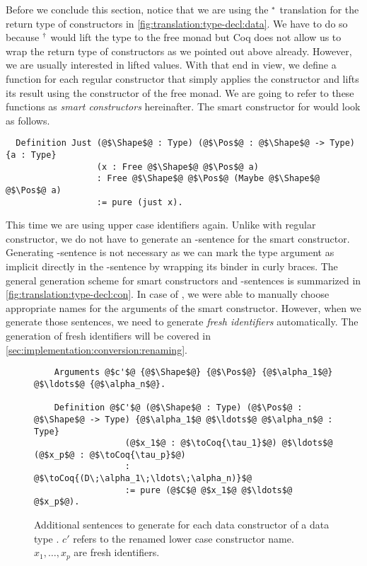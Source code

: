 Before we conclude this section, notice that we are using the ${}^{*}$ translation for the return type of constructors in \autoref{fig:translation:type-decl:data}.
We have to do so because ${}^{\dagger}$ would lift the type to the free monad but Coq does not allow us to wrap the return type of constructors as we pointed out above already.
However, we are usually interested in lifted values.
With that end in view, we define a function for each regular constructor that simply applies the constructor and lifts its result using the  constructor of the free monad.
We are going to refer to these functions as \textit{smart constructors} hereinafter.
The smart constructor for  would look as follows.
\begin{verbatim}
  Definition Just (@$\Shape$@ : Type) (@$\Pos$@ : @$\Shape$@ -> Type) {a : Type}
                  (x : Free @$\Shape$@ @$\Pos$@ a)
                  : Free @$\Shape$@ @$\Pos$@ (Maybe @$\Shape$@ @$\Pos$@ a)
                  := pure (just x).
\end{verbatim}
This time we are using upper case identifiers again.
Unlike with regular constructor, we do not have to generate an -sentence for the smart constructor.
Generating -sentence is not necessary as we can mark the type argument as implicit directly in the -sentence by wrapping its binder in curly braces.
The general generation scheme for smart constructors and -sentences is summarized in \autoref{fig:translation:type-decl:con}.
In case of , we were able to manually choose appropriate names for the arguments of the smart constructor.
However, when we generate those sentences, we need to generate \textit{fresh identifiers} automatically.
The generation of fresh identifiers will be covered in \autoref{sec:implementation:conversion:renaming}.

\begin{figure}[H]
  \begin{verbatim}
    Arguments @$c'$@ {@$\Shape$@} {@$\Pos$@} {@$\alpha_1$@} @$\ldots$@ {@$\alpha_n$@}.

    Definition @$C'$@ (@$\Shape$@ : Type) (@$\Pos$@ : @$\Shape$@ -> Type) {@$\alpha_1$@ @$\ldots$@ @$\alpha_n$@ : Type}
                  (@$x_1$@ : @$\toCoq{\tau_1}$@) @$\ldots$@ (@$x_p$@ : @$\toCoq{\tau_p}$@)
                  : @$\toCoq{(D\;\alpha_1\;\ldots\;\alpha_n)}$@
                  := pure (@$C$@ @$x_1$@ @$\ldots$@ @$x_p$@).
  \end{verbatim}
  \caption{Additional sentences to generate for each data constructor  of a data type . $c'$ refers to the renamed lower case constructor name. $x_1, \ldots, x_p$ are fresh identifiers.}
  \label{fig:translation:type-decl:con}
\end{figure}

